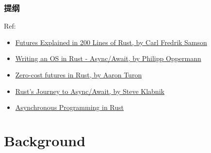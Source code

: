 \begin{frame}
\frametitle{提纲} %
\tableofcontents %
\tiny
Ref:
    \begin{itemize}
        \item \href{https://cfsamson.github.io/books-futures-explained/}{Futures Explained in 200 Lines of Rust, by Carl Fredrik Samson}
        \item \href{https://os.phil-opp.com/async-await/}{Writing an OS in Rust - Async/Await, by Philipp Oppermann}
        \item \href{https://aturon.github.io/tech/2016/08/11/futures/}{Zero-cost futures in Rust, by Aaron Turon}
        \item \href{https://www.infoq.com/presentations/rust-2019/}{Rust’s Journey to Async/Await, by Steve Klabnik}
        \item \href{https://rust-lang.github.io/async-book/index.html}{Asynchronous Programming in Rust}
    \end{itemize}

\end{frame}
% 
\section{Background} %
